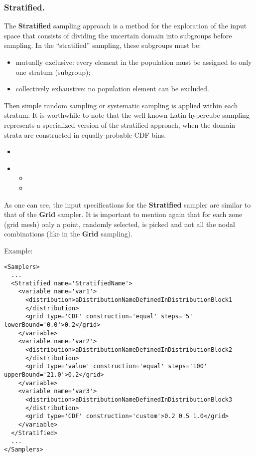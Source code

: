 \subsubsection{Stratified.}
\label{subsubsubsec:Stratified}
The \textbf{Stratified} sampling approach is a method for the exploration of the
input space that consists of dividing the uncertain domain into subgroups before
sampling.
%
In the ``stratified'' sampling, these subgroups must be:
\begin{itemize}
 \item mutually exclusive: every element in the population must be assigned to
   only one stratum (subgroup);
 \item collectively exhaustive: no population element can be excluded.
\end{itemize}

Then simple random sampling or systematic sampling is applied within each
stratum.
%
It is worthwhile to note that the well-known Latin hypercube sampling represents
a specialized version of the stratified approach, when the domain strata are
constructed in equally-probable CDF bins.

%
\attrIntro
\begin{itemize}
\itemsep0em
\item \nameDescription
\end{itemize}
\begin{itemize}
\item \variableDescription
 \variableChildrenIntro
 \begin{itemize}
    \item \distributionDescription
    \item \gridDescription
  \end{itemize}
\end{itemize}

As one can see, the input specifications for the \textbf{Stratified} sampler are
similar to that of the \textbf{Grid} sampler.
%
It is important to mention again that for each zone (grid mesh) only a point,
randomly selected, is picked and not all the nodal combinations (like in the
\textbf{Grid} sampling).

Example:
\begin{lstlisting}[style=XML,morekeywords={construction,steps,lowerBound,upperBound}]
<Samplers>
  ...
  <Stratified name='StratifiedName'> 
    <variable name='var1'> 
      <distribution>aDistributionNameDefinedInDistributionBlock1
      </distribution> 
      <grid type='CDF' construction='equal' steps='5' lowerBound='0.0'>0.2</grid> 
    </variable>
    <variable name='var2'> 
      <distribution>aDistributionNameDefinedInDistributionBlock2
      </distribution> 
      <grid type='value' construction='equal' steps='100' upperBound='21.0'>0.2</grid> 
    </variable> 
    <variable name='var3'> 
      <distribution>aDistributionNameDefinedInDistributionBlock3
      </distribution> 
      <grid type='CDF' construction='custom'>0.2 0.5 1.0</grid> 
    </variable>
  </Stratified>
  ...
</Samplers>
\end{lstlisting}

